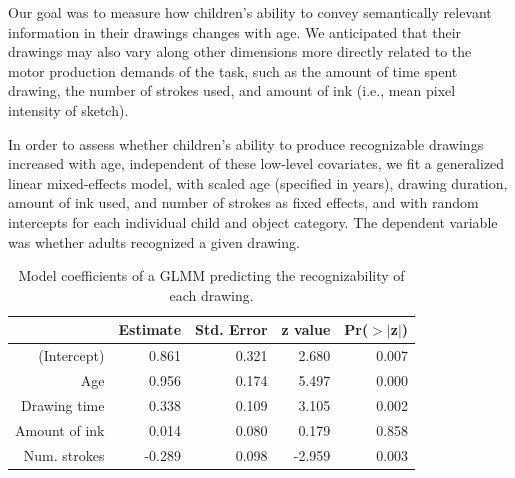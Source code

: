\documentclass[10pt, letterpaper]{article}
\begin{document}
Our goal was to measure how children's ability to convey semantically
relevant information in their drawings changes with age. We anticipated
that their drawings may also vary along other dimensions more directly
related to the motor production demands of the task, such as the amount
of time spent drawing, the number of strokes used, and amount of ink
(i.e., mean pixel intensity of sketch).

In order to assess whether children's ability to produce recognizable
drawings increased with age, independent of these low-level covariates,
we fit a generalized linear mixed-effects model, with scaled age
(specified in years), drawing duration, amount of ink used, and number
of strokes as fixed effects, and with random intercepts for each
individual child and object category. The dependent variable was whether
adults recognized a given drawing.

\begin{table}[t]
\centering
\begin{tabular}{rrrrr}
  \hline
 & Estimate & Std. Error & z value & Pr($>$$|$z$|$) \\
  \hline
(Intercept) & 0.861 & 0.321 & 2.680 & 0.007 \\
  Age & 0.956 & 0.174 & 5.497 & 0.000 \\
  Drawing time & 0.338 & 0.109 & 3.105 & 0.002 \\
  Amount of ink & 0.014 & 0.080 & 0.179 & 0.858 \\
  Num. strokes & -0.289 & 0.098 & -2.959 & 0.003 \\
   \hline
\end{tabular}
\caption{Model coefficients of a GLMM predicting the recognizability of each drawing.}
\end{table}
\end{document}
